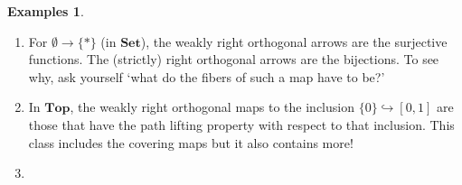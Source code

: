 \documentclass[11pt]{amsart}
\theoremstyle{plain}
\theoremstyle{definition}
\newtheorem*{egs*}{Examples}
\newcommand{\Top}{\mathbf{Top}}
\newcommand{\Set}{{\mathbf{Set}}}
\begin{document}
\begin{egs*}\
  \begin{enumerate}[label=(\alph*)]
  \item For $\emptyset \to \{*\}$ (in $\Set$), the weakly right orthogonal arrows are the surjective functions. The (strictly) right orthogonal arrows are the bijections. To see why, ask yourself `what do the fibers of such a map have to be?' 
  \item In $\Top$, the weakly right orthogonal maps to the inclusion $\{0\} \hookrightarrow [0,1]$ are those that have the path lifting property with respect to that inclusion. This class includes the covering maps but it also contains more! 
  \item 
  
  \end{enumerate}
\end{egs*}
\end{document}
